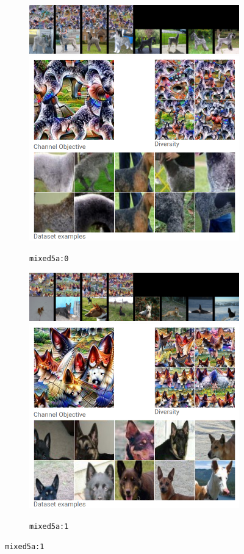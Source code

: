 \documentclass[12pt]{article}
\begin{document}
\begin{figure}[p]
  \centering
  \vspace{-1.5em}

  \begin{subfigure}{\linewidth}
    \centering
    \includegraphics[width=\linewidth]{fig/mixed5a_0.png}
    \includegraphics[width=0.4\linewidth]{fig/olah_mixed5a_0.png}
    \caption{\texttt{mixed5a:0}}
  \end{subfigure}
  
  \vspace{0.5em}

  \begin{subfigure}{\linewidth}
    \centering
    \includegraphics[width=\linewidth]{fig/mixed5a_1.png}
    \includegraphics[width=0.5\linewidth]{fig/olah_mixed5a_1.png}
    \caption{\texttt{mixed5a:1}}
  \end{subfigure}
\end{figure}
\end{document}
